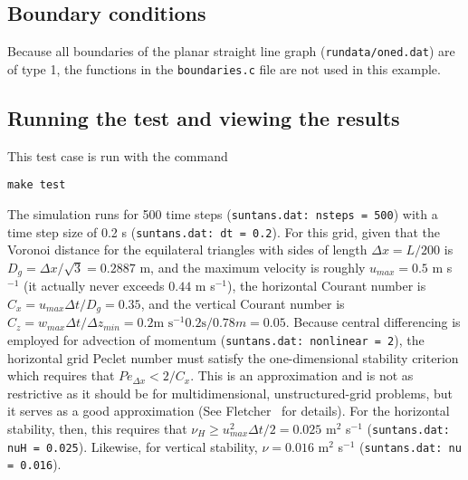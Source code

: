\documentclass[12pt,oneside]{article}
\begin{document}
\subsection{Boundary conditions}

Because all boundaries of the planar
straight line graph (\verb+rundata/oned.dat+) are of type 1, the functions in the \verb+boundaries.c+ file are
not used in this example.

\subsection{Running the test and viewing the results}

This test case is run with the command
\begin{verbatim}
make test
\end{verbatim}
The simulation runs for 500 time steps (\verb+suntans.dat: nsteps = 500+) with a time step size of 0.2 s (\verb+suntans.dat: dt = 0.2+).
For this grid, given that the Voronoi distance for the equilateral triangles with sides of length $\Delta x=L/200$
is $D_g = \Delta x/\sqrt{3} = 0.2887$ m, and the maximum velocity is roughly $u_{max}=0.5$ m s$^{-1}$ (it actually
never exceeds $0.44$ m s$^{-1}$),
the horizontal Courant number is $C_x=u_{max}\Delta t/D_g = 0.35$, and the vertical Courant number is
$C_z=w_{max}\Delta t/\Delta z_{min}=0.2\mbox{m s}^{-1} 0.2\mbox{s}/0.78 m=0.05$.  Because central differencing
is employed for advection of momentum (\verb+suntans.dat: nonlinear = 2+), 
the horizontal grid Peclet number must satisfy the one-dimensional stability criterion which requires
that  $Pe_{\Delta x}<2/C_x$.  This is an approximation and is not as restrictive as it should be for multidimensional,
unstructured-grid problems, but it serves as a good approximation (See Fletcher~\cite{FLETCHER[1997]} for details).
For the horizontal stability, then, this requires that $\nu_H\ge u_{max}^2\Delta t/2 = 0.025$ m$^2$ s$^{-1}$ (\verb+suntans.dat: nuH = 0.025+).
Likewise, for vertical stability, $\nu = 0.016$  m$^2$ s$^{-1}$ (\verb+suntans.dat: nu = 0.016+).
\end{document}
